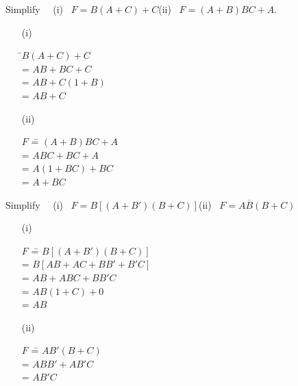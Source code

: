 \begin{problem}\label{prob5.57}
Simplify~~ (i)~ $F=B(A+C)+C$\quad (ii)~ $F=(A+B)BC+A$.
\end{problem}

\begin{solution}
\begin{itemize}
\item[(i)]
\begin{tabbing}
\phantom{AAAAAA} \=\quad $B(A+C)+C$\\[3pt]
                  \>= $AB+BC+C$\\[3pt]
                  \>= $AB+C(1+B)$\\[3pt]
                  \>= $AB+C$
\end{tabbing}

\item[(ii)]
\begin{tabbing}
$F$ \== $(A+B)BC+A$\\[3pt]
    \>= $ABC+BC+A$\\[3pt]
    \>= $A(1+BC)+BC$\\[3pt]
    \>= $A+BC$
\end{tabbing}
\end{itemize}
\end{solution}

\begin{problem}\label{prob5.58}
Simplify~~ (i)~ $F=B[(A+B')(B+C)]$\quad (ii)~ $F=A\overline{B}(B+C)$
\end{problem}

\begin{solution}
\begin{itemize}
\item[(i)] 
\begin{tabbing}
\phantom{AAAAAi} $F$ \== $B[(A+B')(B+C)]$\\[3pt]
                    \>= $B[AB+AC+BB'+B'C]$\\[3pt]
                    \>= $AB+ABC+BB'C$\\[3pt]
                    \>= $AB(1+C)+0$\\[3pt]
                    \>= $AB$
\end{tabbing}

\item[(ii)] 
\begin{tabbing}
$F$ \== $AB'(B+C)$\\[3pt]
    \>= $ABB'+AB'C$\\[3pt]
    \>= $AB'C$
\end{tabbing}
\end{itemize}
\end{solution}


